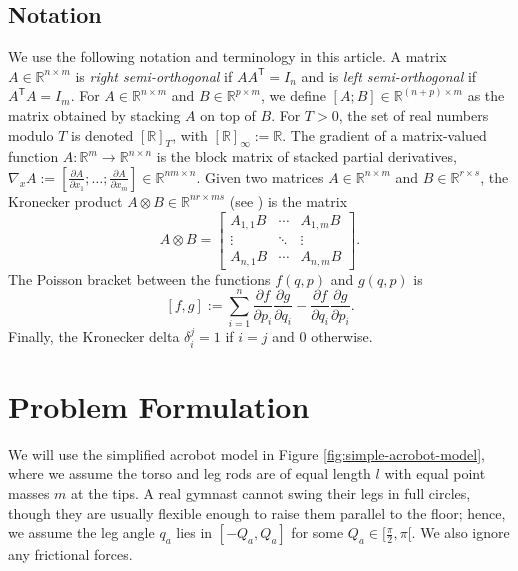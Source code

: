 \documentclass[journal,twoside,web]{ieeecolor}
\newcommand*{\tpose}{^\mathsf{T}}
\newcommand*{\Rt}[1]{[\R]_{#1}}
\newcommand*{\R}{\mathbb{R}}
\newcommand*{\Id}[1]{I_{#1}}
\newcommand*{\pdiff}[2]{\frac{\partial #1}{\partial #2}}
\begin{document}
\subsection{Notation}
We use the following notation and terminology in this article.
A matrix \(A \in \R^{n \times m}\) is \textit{right semi-orthogonal} if
\(A A\tpose = \Id{n}\) and is \textit{left semi-orthogonal} if 
\(A\tpose A = \Id{m}\).
For \(A \in \R^{n\times m}\) and \(B \in \R^{p \times m}\),
we define \([A;B] \in \R^{(n+p)\times m}\) as the matrix obtained by stacking \(A\)
on top of \(B\). 
For \(T > 0\), the set of real numbers modulo \(T\) is denoted \(\Rt{T}\), with
\(\Rt{\infty} := \R\).
The gradient of a matrix-valued function 
\(A : \R^m \rightarrow \R^{n\times n}\) is the block matrix of stacked partial
derivatives, 
\(\nabla_xA := [\pdiff{A}{x_1};\ldots;\pdiff{A}{x_m}] \in \R^{nm \times n}\).
Given two matrices \(A \in \R^{n \times m}\) and \(B \in \R^{r \times s}\), the
Kronecker product \(A \otimes B \in \R^{nr \times ms}\) (see \cite{kronprod}) is
the matrix
\begin{equation}\label{eqn:kronprod}
    A \otimes B = \begin{bmatrix}
        A_{1,1}B & \cdots & A_{1,m} B \\
        \vdots & \ddots & \vdots \\
        A_{n,1} B & \cdots & A_{n,m} B
    \end{bmatrix} 
    .
\end{equation}
The Poisson bracket \cite{landau_mechanics} between the functions
\(f(q,p)\) and \(g(q,p)\) is
\begin{equation}\label{eqn:poisson-bracket}
    [f,g] := \sum \limits_{i=1}^n \pdiff{f}{p_i}\pdiff{g}{q_i} - 
        \pdiff{f}{q_i}\pdiff{g}{p_i}
    .
\end{equation}
Finally, the Kronecker delta \(\delta_i^j = 1\) if \(i = j\) and \(0\)
otherwise.

\section{Problem Formulation}\label{sec:problem-formulation}
We will use the simplified acrobot model in Figure
\ref{fig:simple-acrobot-model}, where we assume the torso and leg rods are of
equal length \(l\) with equal point masses \(m\) at the tips.
A real gymnast cannot swing their legs in full circles, though they
are usually flexible enough to raise them parallel to the floor;
hence, we assume the leg angle \(q_a\) lies in \([-Q_a, Q_a]\) for some
\(Q_a \in [\frac{\pi}{2}, \pi[\). 
We also ignore any frictional forces.
\end{document}
